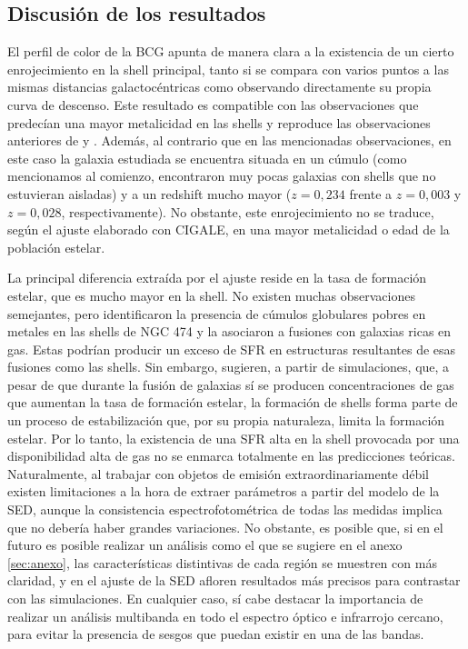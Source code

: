 \subsection{Discusión de los resultados}
El perfil de color de la BCG apunta de manera clara a la existencia de un cierto enrojecimiento en la shell principal, tanto si se compara con varios puntos a las mismas distancias galactocéntricas como observando directamente su propia curva de descenso. Este resultado es compatible con las observaciones que predecían una mayor metalicidad en las shells \citep{popGalaxiesShellsIllustris2017} y reproduce las observaciones anteriores de \citet{mihosStelLARPOPULATIONSOUTER2013} y \citet{limanetoNGC4104Shell2020}. Además, al contrario que en las mencionadas observaciones, en este caso la galaxia estudiada se encuentra situada en un cúmulo (como mencionamos al comienzo, \citet{malinCatalogEllipticalGalaxies1983} encontraron muy pocas galaxias con shells que no estuvieran aisladas) y a un redshift mucho mayor (\(z = 0,234\) frente a \(z = 0,003\) y \(z = 0,028\), respectivamente). No obstante, este enrojecimiento no se traduce, según el ajuste elaborado con CIGALE, en una mayor metalicidad o edad de la población estelar. \par

La principal diferencia extraída por el ajuste reside en la tasa de formación estelar, que es mucho mayor en la shell. No existen muchas observaciones semejantes, pero \citet{limGlobularClustersTracers2017} identificaron la presencia de cúmulos globulares pobres en metales en las shells de NGC 474 y la asociaron a fusiones con galaxias ricas en gas. Estas podrían producir un exceso de SFR en estructuras resultantes de esas fusiones como las shells. Sin embargo, \citet{peterssonStarburstQuenchingMergerdriven2023} sugieren, a partir de simulaciones, que, a pesar de que durante la fusión de galaxias sí se producen concentraciones de gas que aumentan la tasa de formación estelar, la formación de shells forma parte de un proceso de estabilización que, por su propia naturaleza, limita la formación estelar. Por lo tanto, la existencia de una SFR alta en la shell provocada por una disponibilidad alta de gas no se enmarca totalmente en las predicciones teóricas. Naturalmente, al trabajar con objetos de emisión extraordinariamente débil existen limitaciones a la hora de extraer parámetros a partir del modelo de la SED, aunque la consistencia espectrofotométrica de todas las medidas implica que no debería haber grandes variaciones. No obstante, es posible que, si en el futuro es posible realizar un análisis como el que se sugiere en el anexo \ref{sec:anexo}, las características distintivas de cada región se muestren con más claridad, y en el ajuste de la SED afloren resultados más precisos para contrastar con las simulaciones. En cualquier caso, sí cabe destacar la importancia de realizar un análisis multibanda en todo el espectro óptico e infrarrojo cercano, para evitar la presencia de sesgos que puedan existir en una de las bandas.